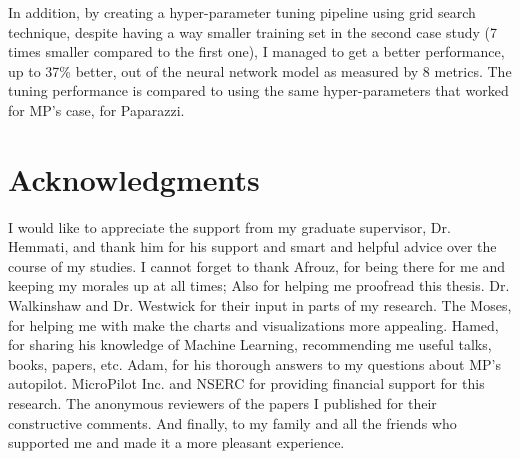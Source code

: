 In addition, by creating a hyper-parameter tuning pipeline using grid search technique, despite having a way smaller training set in the second case study (7 times smaller compared to the first one), I managed to get a better performance, up to 37\% better, out of the neural network model as measured by 8 metrics.
The tuning performance is compared to using the same hyper-parameters that worked for MP's case, for Paparazzi.%




\chapter{Acknowledgments}
I would like to appreciate the support from my graduate supervisor, Dr. Hemmati, and thank him for his support and smart and helpful advice over the course of my studies.
I cannot forget to thank Afrouz, for being there for me and keeping my morales up at all times; Also for helping me proofread this thesis.
Dr. Walkinshaw and Dr. Westwick for their input in parts of my research.
The Moses, for helping me with make the charts and visualizations more appealing.
Hamed, for sharing his knowledge of Machine Learning, recommending me useful talks, books, papers, etc.
Adam, for his thorough answers to my questions about MP's autopilot.
MicroPilot Inc. and NSERC for providing financial support for this research.
The anonymous reviewers of the papers I published for their constructive comments.
And finally, to my family and all the friends who supported me and made it a more pleasant experience.


